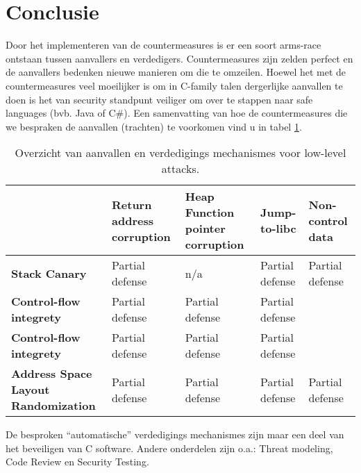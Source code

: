 \documentclass[../main.tex]{subfiles}
\begin{document}
\section{Conclusie}
Door het implementeren van de countermeasures is er een soort arms-race ontstaan tussen aanvallers en verdedigers. 
Countermeasures zijn zelden perfect en de aanvallers bedenken nieuwe manieren om die te omzeilen.
Hoewel het met de countermeasures veel moeilijker is om in C-family talen dergerlijke aanvallen te doen is het van security standpunt veiliger om over te stappen naar safe languages (bvb. Java of C\#).
Een samenvatting van hoe de countermeasures die we bespraken de aanvallen (trachten) te voorkomen vind u in tabel \ref{t:overview}.
\begin{table}
		\begin{tabular}{|p{3cm}| p{3cm} p{3cm} p{3cm} p{3cm}|}
				\hline
				& \textbf{Return address corruption} & \textbf{Heap Function pointer corruption} & \textbf{Jump-to-libc} & \textbf{Non-control data} \\ \hline \hline
				\textbf{Stack Canary} & Partial defense & n/a & Partial defense & Partial defense \\ \hline
				\textbf{Control-flow integrety} & Partial defense & Partial defense & Partial defense & \\ \hline 
				\textbf{Control-flow integrety} &  Partial defense & Partial defense & Partial defense & \\ \hline 
				\textbf{Address Space Layout Randomization} &  Partial defense & Partial defense & Partial defense & Partial defense \\ \hline 
		\end{tabular}
		\caption{Overzicht van aanvallen en verdedigings mechanismes voor low-level attacks.}
		\label{t:overview}
\end{table}

De besproken ``automatische'' verdedigings mechanismes zijn maar een deel van het beveiligen van C software.
Andere onderdelen zijn o.a.: Threat modeling, Code Review en Security Testing.
\end{document}
